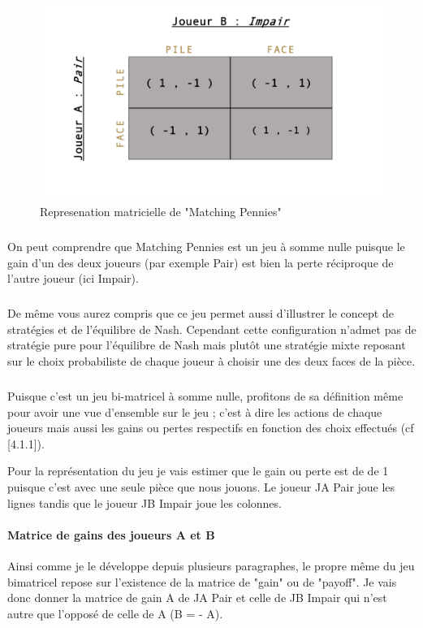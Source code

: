 \documentclass[a4paper, 12pt, twoside]{article}
\begin{document}
{{\begin{figure}[h!]
\centering
\includegraphics[scale=0.4]{Matching.pdf}
\caption{Represenation matricielle de "Matching Pennies"}
\end{figure} 

\subparagraph*{}{On peut comprendre que \textsf{Matching Pennies} est un jeu à somme nulle puisque le gain d'un des deux joueurs (par exemple Pair) est bien la perte réciproque de l'autre joueur (ici Impair).} 
\subparagraph*{}{De même vous aurez compris que ce jeu permet aussi d'illustrer le concept  de stratégies et de l'\textsf{équilibre de Nash}. Cependant cette configuration n'admet pas de stratégie pure pour l'\textsf{équilibre de Nash} mais plutôt une stratégie mixte reposant sur le choix probabiliste de chaque joueur à choisir une des deux faces de la pièce.}

\subparagraph*{}{Puisque c'est un jeu bi-matricel à somme nulle, profitons de sa définition même pour avoir une vue d'ensemble sur le jeu ; c'est à dire les actions de chaque joueurs mais aussi les gains ou pertes respectifs en fonction des choix effectués (cf [4.1.1]).} \newline

Pour la représentation du jeu je vais estimer que le gain ou perte est de de 1 puisque c'est avec une seule pièce que nous jouons. Le joueur \textsf{JA} \textsf{Pair} joue les lignes tandis que le joueur \textsf{JB} \textsf{Impair} joue les colonnes.  \vspace{0.4 cm}

\paragraph*{Matrice de gains des joueurs A et B}{Ainsi comme je le développe depuis plusieurs paragraphes, le propre même du jeu bimatricel repose sur l'existence de la matrice de "gain" ou de "payoff".  Je vais  donc donner la matrice de gain A de \textsf{JA} \textsf{Pair} et celle de \textsf{JB} \textsf{Impair} qui n'est autre que l'opposé de celle de  A (B = - A).}

}}
\end{document}
